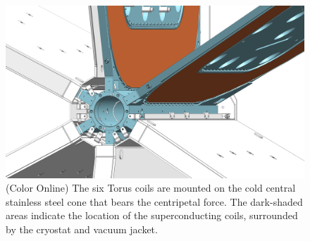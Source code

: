 \documentclass[final,3p,twocolumn]{elsarticle}
\begin{document}
\begin{figure}[htbp!]
\centerline{\includegraphics[width=1.00\columnwidth]{torus-hub-2.png}}
\caption{(Color Online) The six Torus coils are mounted on the cold central stainless steel cone that bears the centripetal force. The
dark-shaded areas indicate the location of the superconducting coils, surrounded by the cryostat and vacuum jacket.}
\label{coil-mount}
\end{figure}
\end{document}
